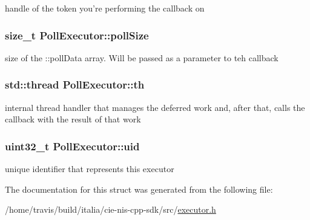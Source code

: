 handle of the token you're performing the callback on \hypertarget{structPollExecutor_aaac2ecbce031c612792e6aea90196af4}{
\subsubsection[{poll\-Size}]{\setlength{\rightskip}{0pt plus 5cm}size\-\_\-t Poll\-Executor\-::poll\-Size}}\label{structPollExecutor_aaac2ecbce031c612792e6aea90196af4}
size of the \-::poll\-Data array. Will be passed as a parameter to teh callback \hypertarget{structPollExecutor_aedea242ce74052608ae9358ec93d70e2}{
\subsubsection[{th}]{\setlength{\rightskip}{0pt plus 5cm}std\-::thread Poll\-Executor\-::th}}\label{structPollExecutor_aedea242ce74052608ae9358ec93d70e2}
internal thread handler that manages the deferred work and, after that, calls the callback with the result of that work \hypertarget{structPollExecutor_a939fe0fc384eb018f62839be04fa519d}{
\subsubsection[{uid}]{\setlength{\rightskip}{0pt plus 5cm}uint32\-\_\-t Poll\-Executor\-::uid}}\label{structPollExecutor_a939fe0fc384eb018f62839be04fa519d}
unique identifier that represents this executor 

The documentation for this struct was generated from the following file\-:\begin{DoxyCompactItemize}
\item 
/home/travis/build/italia/cie-\/nis-\/cpp-\/sdk/src/\hyperlink{executor_8h}{executor.\-h}\end{DoxyCompactItemize}
